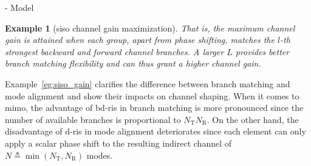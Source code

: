 \documentclass[journal]{IEEEtran}
\newtheorem{example}{Example}
\begin{document}
\begin{section}{- Model}
\begin{example}[\gls{siso} channel gain maximization]
		That is, the maximum channel gain is attained when each group, apart from phase shifting, matches the $l$-th strongest backward and forward channel branches.
		A larger $L$ provides better branch matching flexibility and can thus grant a higher channel gain.
	\end{example}

	Example~\ref{eg:siso_gain} clarifies the difference between branch matching and mode alignment and show their impacts on channel shaping.
	When it comes to \gls{mimo}, the advantage of \gls{bd}-\gls{ris} in branch matching is more pronounced since the number of available branches is proportional to $N_\mathrm{T} N_\mathrm{R}$. On the other hand, the disadvantage of \gls{d}-\gls{ris} in mode alignment deteriorates since each element can only apply a scalar phase shift to the resulting indirect channel of $N \triangleq \min(N_\mathrm{T}, N_\mathrm{R})$ modes.







\end{section}
\end{document}
